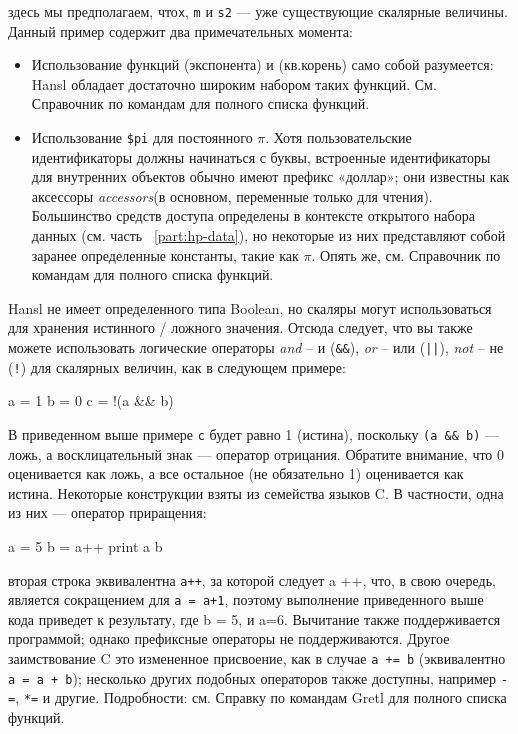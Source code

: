 здесь мы предполагаем, что\texttt{x}, \texttt{m} и \texttt{s2} --- уже
существующие скалярные величины. Данный пример содержит два
примечательных момента:
\begin{itemize}
\item Использование функций  (экспонента) и 
  (кв.корень) само собой разумеется: Hansl обладает достаточно широким
  набором таких функций. См. Справочник по командам для полного списка
  функций.
\item Использование \verb|$pi| для постоянного $\pi$. Хотя
  пользовательские идентификаторы должны начинаться с буквы,
  встроенные идентификаторы для внутренних объектов обычно имеют
  префикс «доллар»; они известны как аксессоры \emph{accessors}(в
  основном, переменные только для чтения). Большинство средств доступа
  определены в контексте открытого набора данных (см. часть
  ~\ref{part:hp-data}), но некоторые из них представляют собой заранее
  определенные константы, такие как $\pi$. Опять же, см. Справочник по
  командам для полного списка функций.
\end{itemize}

Hansl не имеет определенного типа Boolean, но скаляры могут
использоваться для хранения истинного / ложного значения. Отсюда
следует, что вы также можете использовать логические операторы
\emph{and} – и (\verb|&&|), \emph{or} – или (\verb+||+), \emph{not} –
не (\verb|!|) для скалярных величин, как в следующем примере:
\begin{code}
  a = 1
  b = 0
  c = !(a && b) 
\end{code}
В приведенном выше примере \texttt{c} будет равно 1 (истина),
поскольку \verb|(a && b)| --- ложь, а восклицательный знак ---
оператор отрицания. Обратите внимание, что 0 оценивается как ложь, а
все остальное (не обязательно 1) оценивается как истина.  Некоторые
конструкции взяты из семейства языков C. В частности, одна из них ---
оператор приращения:
\begin{code}
  a = 5
  b = a++
  print a b
\end{code}
вторая строка эквивалентна \texttt{a++}, за которой следует a ++, что,
в свою очередь, является сокращением для \texttt{a = a+1}, поэтому
выполнение приведенного выше кода приведет к результату, где b = 5, и
a=6. Вычитание также поддерживается программой; однако префиксные
операторы не поддерживаются. Другое заимствование C это измененное
присвоение, как в случае \texttt{a += b} (эквивалентно \texttt{a = a +
  b}); несколько других подобных операторов также доступны, например
\texttt{-=}, \texttt{*=} и другие. Подробности: см. Справку по
командам Gretl для полного списка функций.

